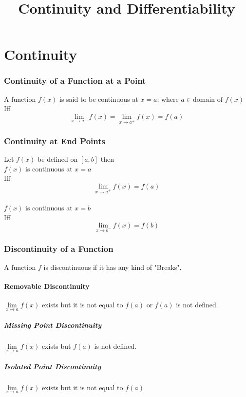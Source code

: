 \documentclass{article}
\title{Continuity and Differentiability}
\author{}
\date{}
\begin{document}
\maketitle
\part*{Continuity}

\section{Continuity of a Function at a Point}
A function $f(x)$ is said to be continuous at $x=a$; where $a \in \text{domain of $f(x)$}$ \\
Iff $$\lim\limits_{x \to a^-}{f(x)}=\lim\limits_{x \to a^+}{f(x)}=f(a)$$

\section{Continuity at End Points}
Let $f(x)$ be defined on $[a,b]$ then 
\\
$f(x)$ is continuous at $x=a$ 
\\
Iff $$\lim\limits_{x \to a^+}{f(x)}=f(a)$$
\\
$f(x)$ is continuous at $x=b$
\\
Iff $$\lim\limits_{x \to b^-}{f(x)}=f(b)$$

\section{Discontinuity of a Function}
A function $f$ is discontinuous if it has any kind of "Breaks".

\subsection{Removable Discontinuity}
$\lim\limits_{x \to a}{f(x)}$ exists but it is not equal to $f(a)$ or $f(a)$ is not defined.
\subsubsection{Missing Point Discontinuity}
$\lim\limits_{x \to a }{f(x)}$ exists but $f(a)$ is not defined.

\subsubsection{Isolated Point Discontinuity}
$\lim\limits_{x \to a}{f(x)}$ exists but it is not equal to $f(a)$
\end{document}
